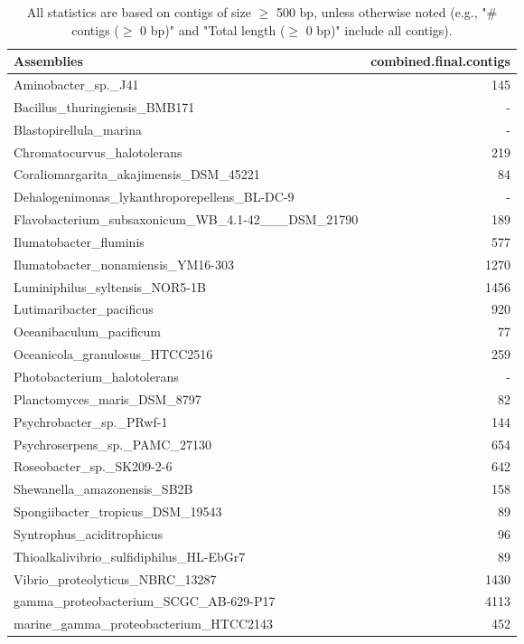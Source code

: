 \documentclass[12pt,a4paper]{article}
\begin{document}
\begin{table}[ht]
\begin{center}
\caption{All statistics are based on contigs of size $\geq$ 500 bp, unless otherwise noted (e.g., "\# contigs ($\geq$ 0 bp)" and "Total length ($\geq$ 0 bp)" include all contigs).}
\begin{tabular}{|l*{1}{|r}|}
\hline
Assemblies & combined.final.contigs \\ \hline
Aminobacter\_sp.\_J41 & 145 \\ \hline
Bacillus\_thuringiensis\_BMB171 & - \\ \hline
Blastopirellula\_marina & - \\ \hline
Chromatocurvus\_halotolerans & 219 \\ \hline
Coraliomargarita\_akajimensis\_DSM\_45221 & 84 \\ \hline
Dehalogenimonas\_lykanthroporepellens\_BL-DC-9 & - \\ \hline
Flavobacterium\_subsaxonicum\_WB\_4.1-42\_\_\_DSM\_21790 & 189 \\ \hline
Ilumatobacter\_fluminis & 577 \\ \hline
Ilumatobacter\_nonamiensis\_YM16-303 & 1270 \\ \hline
Luminiphilus\_syltensis\_NOR5-1B & 1456 \\ \hline
Lutimaribacter\_pacificus & 920 \\ \hline
Oceanibaculum\_pacificum & 77 \\ \hline
Oceanicola\_granulosus\_HTCC2516 & 259 \\ \hline
Photobacterium\_halotolerans & - \\ \hline
Planctomyces\_maris\_DSM\_8797 & 82 \\ \hline
Psychrobacter\_sp.\_PRwf-1 & 144 \\ \hline
Psychroserpens\_sp.\_PAMC\_27130 & 654 \\ \hline
Roseobacter\_sp.\_SK209-2-6 & 642 \\ \hline
Shewanella\_amazonensis\_SB2B & 158 \\ \hline
Spongiibacter\_tropicus\_DSM\_19543 & 89 \\ \hline
Syntrophus\_aciditrophicus & 96 \\ \hline
Thioalkalivibrio\_sulfidiphilus\_HL-EbGr7 & 89 \\ \hline
Vibrio\_proteolyticus\_NBRC\_13287 & 1430 \\ \hline
gamma\_proteobacterium\_SCGC\_AB-629-P17 & 4113 \\ \hline
marine\_gamma\_proteobacterium\_HTCC2143 & 452 \\ \hline
\end{tabular}
\end{center}
\end{table}
\end{document}
